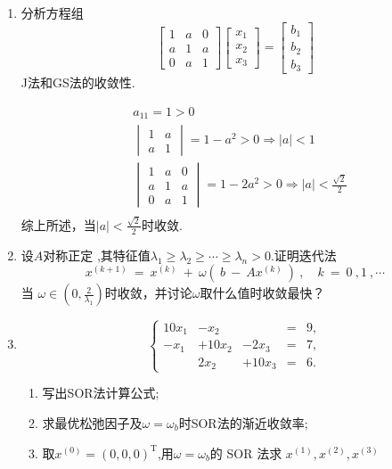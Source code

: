 \documentclass[a4paper]{article}
\begin{document}
\begin{enumerate}
  \item 分析方程组$$\begin{bmatrix}
  1 & a & 0 \\
  a & 1 & a \\
  0 & a & 1
  \end{bmatrix}
  \begin{bmatrix}
  x_1 \\
  x_2 \\
  x_3
  \end{bmatrix}
  =
  \begin{bmatrix}
  b_1 \\
  b_2 \\
  b_3
  \end{bmatrix}$$J法和GS法的收敛性.
  \begin{solution}
    \begin{align*}
      &a_{11}=1>0\\
      &\begin{vmatrix}1 & a \\ a & 1\end{vmatrix}=1-a^2>0\Rightarrow |a|<1\\
      &\begin{vmatrix}1 & a & 0 \\ a & 1 & a \\ 0 & a & 1\end{vmatrix}=1-2a^2>0\Rightarrow |a|<\frac{\sqrt{2}}{2}\\
    \end{align*}
    综上所述，当$|a|<\frac{\sqrt{2}}{2}$时收敛.\\
  \end{solution}

  \item 设$A$对称正定 ,其特征值$\lambda_1\geq\lambda_2\geq\cdots\geq\lambda_n>0.$证明迭代法$$x^{(k+1)}\:=\:x^{(k)}\:+\:\omega(\:b\:-\:Ax^{(k)}\:)\:,\quad k\:=\:0\:,1\:,\cdots $$当 $\omega\in\left(0,\frac{2}{\lambda_{1}}\right)$时收敛，并讨论$\omega$取什么值时收敛最快？
  \begin{solution}
    
  \end{solution}


  \item 
  $$
  \left\{
  \begin{array}{rrrrr}
  10x_1 & - x_2 &              & = & 9,\\
  - x_1 & + 10x_2 & - 2x_3 & = & 7,\\
        &   2x_2 & + 10x_3 & = & 6.
  \end{array}
  \right.
  $$
  \begin{enumerate}[label=(\arabic*)]
    \item 写出SOR法计算公式;
    \item 求最优松弛因子及$\omega=\omega_b$时SOR法的渐近收敛率;
    \item 取$x^{(0)}=\left(0,0,0\right)^{\mathrm{T}}$,用$\omega=\omega_b$的 SOR 法求 $x^{(1)},x^{(2)},x^{(3)}$
  \end{enumerate}


\end{enumerate}
\end{document}
